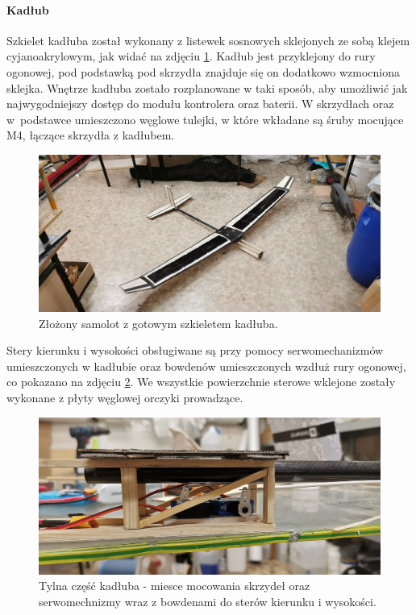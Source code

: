 \documentclass[12pt, a4paper]{article}
\begin{document}
\FloatBarrier
\clearpage
\paragraph{Kadłub}\mbox{}

Szkielet kadłuba został wykonany z listewek sosnowych sklejonych ze sobą klejem cyjanoakrylowym, jak widać na zdjęciu \ref{fig:szkielet}. Kadłub jest przyklejony do rury ogonowej, pod podstawką pod skrzydła znajduje się on dodatkowo wzmocniona sklejka. Wnętrze kadłuba zostało rozplanowane w taki sposób, aby umożliwić jak najwygodniejszy dostęp do modułu kontrolera oraz baterii. W skrzydłach oraz w~podstawce umieszczono węglowe tulejki, w które wkładane są śruby mocujące M4, łączące skrzydła z kadłubem. 

\begin{figure}[ht]
    \centering
    \includegraphics[width=1\textwidth]{szkielet}
    \caption{Złożony samolot z gotowym szkieletem kadłuba.}
    \label{fig:szkielet}
\end{figure}

Stery kierunku i wysokości obsługiwane są przy pomocy serwomechanizmów umieszczonych w kadłubie oraz bowdenów umieszczonych wzdłuż rury ogonowej, co pokazano na zdjęciu \ref{fig:tyl}. We wszystkie powierzchnie sterowe wklejone zostały wykonane z płyty węglowej orczyki prowadzące. 

\begin{figure}[ht]
    \centering
    \includegraphics[width=1\textwidth]{tyl}
    \caption{Tylna część kadłuba - miesce mocowania skrzydeł oraz serwomechnizmy wraz z bowdenami do sterów kierunku i wysokości.}
    \label{fig:tyl}
\end{figure}
\end{document}
